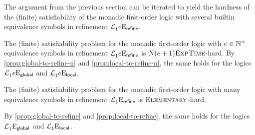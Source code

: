 The argument from the previous section can be iterated to yield the hardness of
the (finite) satisfiability of the monadic first-order logic with several
builtin equivalence symbols in refinement $\mathcal{L}^{{}}_{1}{e}\mathrm{E}_{\mathsf{refine}}$.


\begin{proposition}
The (finite) satisfiability problem for the monadic first-order logic with
$e \in \mathbb{N}^{+}$ equivalence symbols in refinement
$\mathcal{L}^{{}}_{1}{e}\mathrm{E}_{\mathsf{refine}}$ is $\text{\normalfont{\scshape N}}(e+1)\text{\normalfont{\scshape ExpTime}}$-hard.
By \cref{prop:global-to-refine-n} and \cref{prop:local-to-refine-n}, the same
holds for the logics $\mathcal{L}^{{}}_{1}{e}\mathrm{E}_{\mathsf{global}}$ and
$\mathcal{L}^{{}}_{1}{e}\mathrm{E}_{\mathsf{local}}$.
\end{proposition}

\begin{proposition}
The (finite) satisfiability problem for the monadic first-order logic with many
equivalence symbols in refinement $\mathcal{L}^{{}}_{1}{{}}\mathrm{E}_{\mathsf{refine}}$ is
$\text{\normalfont{\scshape Elementary}}$-hard.

By \cref{prop:global-to-refine} and \cref{prop:local-to-refine}, the same
holds for the logics $\mathcal{L}^{{}}_{1}{{}}\mathrm{E}_{\mathsf{global}}$ and
$\mathcal{L}^{{}}_{1}{{}}\mathrm{E}_{\mathsf{local}}$.
\end{proposition}